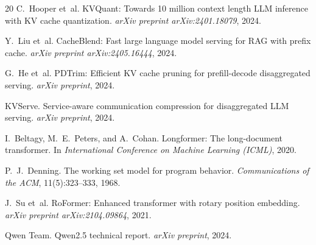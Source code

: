 \documentclass[11pt]{article}
\theoremstyle{definition}
\theoremstyle{plain}
\begin{document}
\begin{thebibliography}{20}
C.~Hooper et~al.
\newblock KVQuant: Towards 10 million context length LLM inference with KV cache quantization.
\newblock \emph{arXiv preprint arXiv:2401.18079}, 2024.

Y.~Liu et~al.
\newblock CacheBlend: Fast large language model serving for RAG with prefix cache.
\newblock \emph{arXiv preprint arXiv:2405.16444}, 2024.

G.~He et~al.
\newblock PDTrim: Efficient KV cache pruning for prefill-decode disaggregated serving.
\newblock \emph{arXiv preprint}, 2024.

KVServe.
\newblock Service-aware communication compression for disaggregated LLM serving.
\newblock \emph{arXiv preprint}, 2024.

I.~Beltagy, M.~E.~Peters, and A.~Cohan.
\newblock Longformer: The long-document transformer.
\newblock In \emph{International Conference on Machine Learning (ICML)}, 2020.

P.~J.~Denning.
\newblock The working set model for program behavior.
\newblock \emph{Communications of the ACM}, 11(5):323--333, 1968.

J.~Su et~al.
\newblock RoFormer: Enhanced transformer with rotary position embedding.
\newblock \emph{arXiv preprint arXiv:2104.09864}, 2021.

Qwen Team.
\newblock Qwen2.5 technical report.
\newblock \emph{arXiv preprint}, 2024.

\end{thebibliography}
\end{document}
